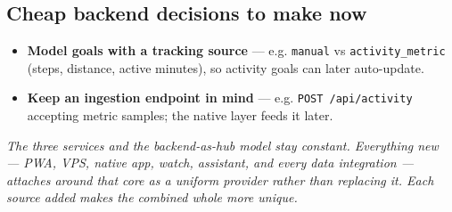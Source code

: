 \documentclass[11pt,a4paper]{article}
\begin{document}
\subsection{Cheap backend decisions to make now}
\begin{itemize}
  \item \textbf{Model goals with a tracking source} --- e.g. \texttt{manual} vs
        \texttt{activity\_metric} (steps, distance, active minutes), so activity
        goals can later auto-update.
  \item \textbf{Keep an ingestion endpoint in mind} --- e.g. \texttt{POST /api/activity}
        accepting metric samples; the native layer feeds it later.
\end{itemize}

\vspace{1em}
\begin{notebox}
\centering\itshape
The three services and the backend-as-hub model stay constant. Everything new ---
PWA, VPS, native app, watch, assistant, and every data integration --- attaches
around that core as a uniform provider rather than replacing it. Each source added
makes the combined whole more unique.
\end{notebox}
\end{document}
